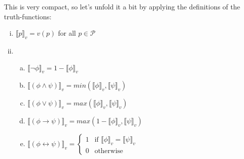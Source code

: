 \begin{enumerate}[\thesection.1]
		This is very compact, so let's unfold it a bit by applying the definitions of the truth-functions:
		\begin{enumerate}[(i)]
		
			\item  $\llbracket p\rrbracket_v=v(p)$ for all $p\in\mathcal{P}$
			
			\item \begin{enumerate}[(a)]
			
				\item  $\llbracket\neg \phi\rrbracket_v=1-\llbracket\phi\rrbracket_v$
				
				\item  $\llbracket(\phi\land \psi)\rrbracket_v=min(\llbracket\phi\rrbracket_v, \llbracket\psi\rrbracket_v)$
				\item[] $\llbracket(\phi\lor \psi)\rrbracket_v=max(\llbracket\phi\rrbracket_v, \llbracket\psi\rrbracket_v)$		
				\item[] $\llbracket(\phi\to \psi)\rrbracket_v=max(1-\llbracket\phi\rrbracket_v, \llbracket\psi\rrbracket_v)$		
				
				\item[] $\llbracket(\phi\leftrightarrow \psi)\rrbracket_v=\begin{cases} 1 & \text{if } \llbracket\phi\rrbracket_v=\llbracket\psi\rrbracket_v\\0&\text{otherwise}\end{cases}$		
	

\end{enumerate}
\end{enumerate}
\end{enumerate}
